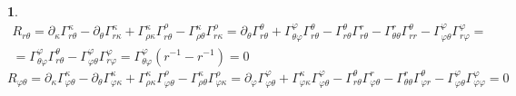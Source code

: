 \documentclass[12pt]{article}
\theoremstyle{definition}
\newtheorem{zad}{}[section]
\begin{document}
\begin{zad}
\begin{multline}
    R_{r\theta}=\partial_\kappa\Gamma^\kappa_{r\theta}-\partial_\theta\Gamma^\kappa_{r\kappa}+\Gamma^\kappa_{\rho\kappa}\Gamma^\rho_{r\theta}-\Gamma^\kappa_{\rho\theta}\Gamma^\rho_{r\kappa}=\partial_\theta\Gamma^\theta_{r\theta}+\Gamma^\varphi_{\theta\varphi}\Gamma^\theta_{r\theta}-\Gamma^\theta_{r\theta}\Gamma^r_{r\theta}-\Gamma^r_{\theta\theta}\Gamma^\theta_{rr}-\Gamma^\varphi_{\varphi\theta}\Gamma^\varphi_{r\varphi}=\\=\Gamma^\varphi_{\theta\varphi}\Gamma^\theta_{r\theta}-\Gamma^\varphi_{\varphi\theta}\Gamma^\varphi_{r\varphi}=\Gamma^\varphi_{\theta\varphi}(r^{-1}-r^{-1})=0
\end{multline}
\begin{equation}
    R_{\varphi\theta}=\partial_\kappa\Gamma^\kappa_{\varphi\theta}-\partial_\theta\Gamma^\kappa_{\varphi\kappa}+\Gamma^\kappa_{\rho\kappa}\Gamma^\rho_{\varphi\theta}-\Gamma^\kappa_{\rho\theta}\Gamma^\rho_{\varphi\kappa}=\partial_\varphi\Gamma^\varphi_{\varphi\theta}+\Gamma^\kappa_{\varphi\kappa}\Gamma^\varphi_{\varphi\theta}-\Gamma^\theta_{r\theta}\Gamma^r_{\varphi\theta}-\Gamma^r_{\theta\theta}\Gamma^\theta_{\varphi r}-\Gamma^\varphi_{\varphi\theta}\Gamma^\varphi_{\varphi\varphi}=0
\end{equation}
\end{zad}
\end{document}
